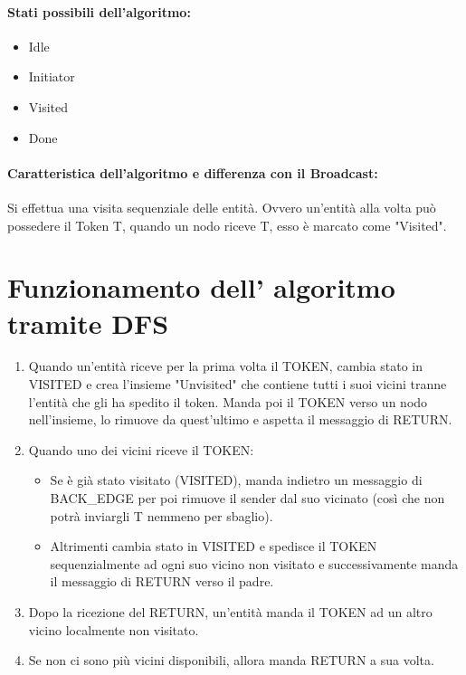 \paragraph{Stati possibili dell'algoritmo:}
\begin{itemize}
    \item Idle
    \item Initiator
    \item Visited
    \item Done
\end{itemize}

\paragraph{Caratteristica dell'algoritmo e differenza con il Broadcast:} Si
effettua una visita sequenziale delle entità. Ovvero un'entità alla volta può
possedere il Token T, quando un nodo riceve T, esso è marcato come "Visited".

\section{Funzionamento dell' algoritmo tramite DFS}
\begin{enumerate}
    \item Quando un'entità riceve per la prima volta il TOKEN, cambia stato in
          VISITED e crea l'insieme "Unvisited" che contiene tutti i suoi vicini tranne
          l'entità che gli ha spedito il token. Manda poi il TOKEN verso un nodo
          nell'insieme, lo rimuove da quest'ultimo e aspetta il messaggio di RETURN.
    \item Quando uno dei vicini riceve il TOKEN:
          \begin{itemize}
              \item Se è già stato visitato (VISITED), manda indietro un messaggio
                    di BACK\_EDGE per poi rimuove il sender dal suo vicinato (così che non
                    potrà inviargli T nemmeno per sbaglio).
              \item Altrimenti cambia stato in VISITED e spedisce il TOKEN
                    sequenzialmente ad ogni suo vicino non visitato e successivamente
                    manda il messaggio di RETURN verso il padre.
          \end{itemize}
    \item Dopo la ricezione del RETURN, un'entità manda il TOKEN ad un altro
          vicino localmente non visitato.
    \item Se non ci sono più vicini disponibili, allora manda RETURN a sua volta.
\end{enumerate}

